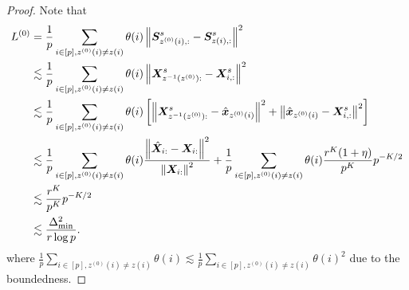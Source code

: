 \documentclass[lettersize,journal]{IEEEtran}
\theoremstyle{definition}
\theoremstyle{definition}
\newcommand{\off}[1]{\left[#1\right]}
\begin{document}
\begin{proof}
Note that 
\begin{align}
    L^{(0)} &= \frac{1}{p} \sum_{i \in [p], z^{(0)}(i) \neq z(i)} \theta(i) \onorm{\mS_{z^{(0)}(i),:}^s - \mS_{z(i),:}^s}^2 \\
    & \lesssim \frac{1}{p} \sum_{i \in [p], z^{(0)}(i) \neq z(i)} \theta(i) \onorm{\mX^s_{z^{-1}(z^{(0)}):} - \mX^s_{i,:}}^2\\
    & \lesssim \frac{1}{p} \sum_{i \in [p], z^{(0)}(i) \neq z(i)} \theta(i) \off{ \onorm{ \mX^s_{z^{-1}(z^{(0)}):} - \hat \mx_{z^{(0)}(i)} }^2 + \onorm{ \hat \mx_{z^{(0)}(i)} - \mX^s_{i,:}}^2 }\\
    & \lesssim   \frac{1}{p} \sum_{i \in [p], z^{(0)}(i) \neq z(i)} \theta(i) \frac{ \onorm{\hat \mX_{i:} - \mX_{i:}}^2 }{ \onorm{ \mX_{i:}}^2 } +  \frac{1}{p} \sum_{i \in [p], z^{(0)}(i) \neq z(i)} \theta(i)  \frac{r^K(1 + \eta)}{p^{K}} p^{-K/2} \\
    & \lesssim \frac{r^K}{p^{K}} p^{-K/2} \\
    & \lesssim \frac{\Delta_{\min}^2}{r \log p}.
\end{align}
where $\frac{1}{p} \sum_{i \in [p], z^{(0)}(i) \neq z(i)} \theta(i) \lesssim \frac{1}{p} \sum_{i \in [p], z^{(0)}(i) \neq z(i)} \theta(i)^2$ due to the boundedness.
\end{proof}
\end{document}
